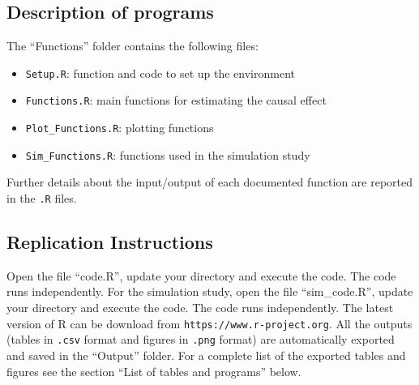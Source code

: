 \documentclass[
]{article}
\begin{document}
\hypertarget{program-list}{%
\subsection{Description of programs}\label{program-list}}

The ``Functions'' folder contains the following files:

\begin{itemize}
\item \texttt{Setup.R}: function and code to set up the environment
\item \texttt{Functions.R}: main functions for estimating the causal effect
\item \texttt{Plot\_Functions.R}: plotting functions
\item \texttt{Sim\_Functions.R}: functions used in the simulation study

\end{itemize}

Further details about the input/output of each documented function are reported in the \texttt{.R} files.

\hypertarget{instructions-empirical}{%
\subsection{Replication Instructions}\label{instructions}}

Open the file ``code.R'', update your directory and execute the code. The code runs independently. For the simulation study, open the file ``sim\_code.R'', update your directory and execute the code. The code runs independently. The latest version of R can be download from \texttt{https://www.r-project.org}. All the outputs (tables in \texttt{.csv} format and figures in \texttt{.png} format) are automatically exported and saved in the ``Output'' folder. For a complete list of the exported tables and figures see the section ``List of tables and programs'' below. 
\end{document}
